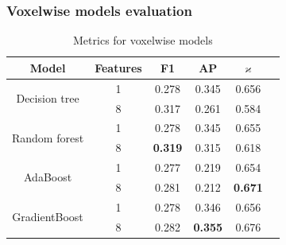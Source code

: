 \documentclass{beamer}
\begin{document}
\begin{frame}
    \frametitle{Voxelwise models evaluation}
    \begin{table}[ht]
        \centering
        \begin{tabular}{|c|c|c|c|c|c| }
            \hline
            \textbf{Model}                 & \textbf{Features} & \textbf{F1}    & \textbf{AP}    & \( \mathbf{\varkappa} \) \\
            \hline
            \multirow{2}{*}{Decision tree} & 1                 & 0.278          & 0.345          & 0.656                    \\
                                           & 8                 & 0.317          & 0.261          & 0.584                    \\
            \hline
            \multirow{2}{*}{Random forest}
                                           & 1                 & 0.278          & 0.345          & 0.655                    \\
                                           & 8                 & \textbf{0.319} & 0.315          & 0.618                    \\
            \hline
            \multirow{2}{*}{AdaBoost}
                                           & 1                 & 0.277          & 0.219          & 0.654                    \\
                                           & 8                 & 0.281          & 0.212          & \textbf{0.671}           \\
            \hline
            \multirow{2}{*}{GradientBoost}
                                           & 1                 & 0.278          & 0.346          & 0.656                    \\
                                           & 8                 & 0.282          & \textbf{0.355} & 0.676                    \\
            \hline
        \end{tabular}
        \caption{Metrics for voxelwise models}
        \label{tab:voxelwise_metrics}
    \end{table}
\end{frame}
\end{document}
